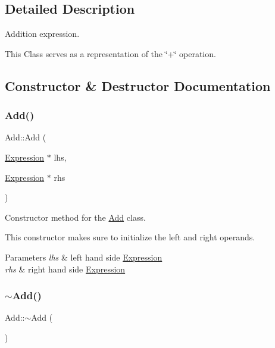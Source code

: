 \subsection{Detailed Description}
Addition expression. 

This Class serves as a representation of the \char`\"{}+\char`\"{} operation. 

\subsection{Constructor \& Destructor Documentation}
\mbox{\label{class_add_aec3988b99721da89e8caa323f37c09f4}} 
\subsubsection{\texorpdfstring{Add()}{Add()}}
{\footnotesize\ttfamily Add\+::\+Add (\begin{DoxyParamCaption}\item[{\hyperlink{class_expression}{Expression} $\ast$}]{lhs,  }\item[{\hyperlink{class_expression}{Expression} $\ast$}]{rhs }\end{DoxyParamCaption})}



Constructor method for the \hyperlink{class_add}{Add} class. 

This constructor makes sure to initialize the left and right operands.


\begin{DoxyParams}{Parameters}
{\em lhs} & left hand side \hyperlink{class_expression}{Expression} \\
\hline
{\em rhs} & right hand side \hyperlink{class_expression}{Expression} \\
\hline
\end{DoxyParams}
\mbox{\label{class_add_a960ca471ede083983766bce089f9af64}} 
\subsubsection{\texorpdfstring{$\sim$\+Add()}{~Add()}}
{\footnotesize\ttfamily Add\+::$\sim$\+Add (\begin{DoxyParamCaption}{ }\end{DoxyParamCaption})}




